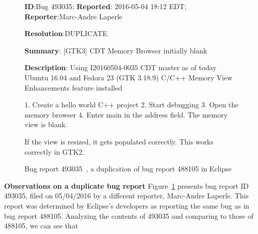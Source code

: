 \begin{figure}
\sf
\small
\textbf{ID}:Bug 493035; \textbf{Reported}: 2016-05-04 18:12 EDT; \textbf{Reporter}:Marc-Andre Laperle

\textbf{Resolution}:DUPLICATE

\textbf{Summary}: [GTK3] CDT Memory Browser initially blank

\textbf{Description}: 
Using I20160504-0035
CDT master as of today
Ubuntu 16.04 and Fedora 23 (GTK 3.18.9)
C/C++ Memory View Enhancements feature installed

1. Create a hello world C++ project
2. Start debugging
3. Open the memory browser
4. Enter main in the address field. The memory view is blank.

If the view is resized, it gets populated correctly. This works correctly in GTK2.
\caption{Bug report 493035~\cite{bug493035}, a duplication of bug report 488105 in Eclipse}
\label{fig:br2}
\end{figure}

\noindent\textbf{Observations on a duplicate bug report}
Figure~\ref{fig:br2} presents bug report ID 493035, filed on
05/04/2016 by a different reporter, Marc-Andre Laperle. This report
was determined by Eclipse's developers as reporting the same bug as in
bug report 488105. Analyzing the contents of 493035 and comparing to
those of 488105, we can see that


